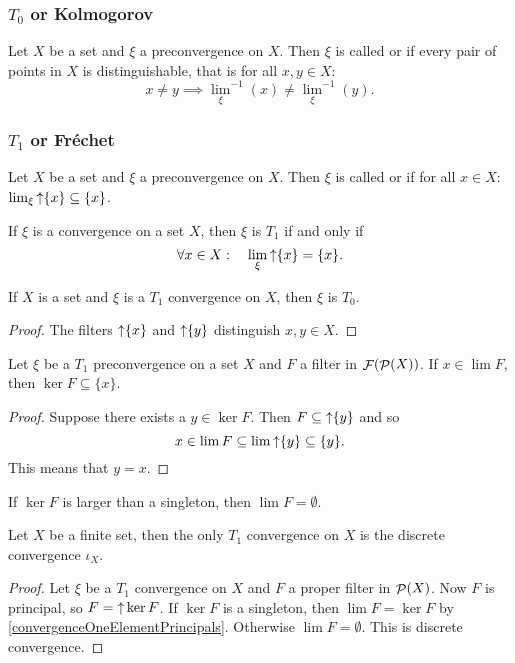 \subsubsection{$T_0$ or Kolmogorov}
\begin{definition}
Let $X$ be a set and $\xi$ a preconvergence on $X$. Then $\xi$ is called  or  if every pair of points in $X$ is distinguishable, that is for all $x,y\in X$:
\[ x\neq y \implies {\lim_\xi}^{-1}(x) \neq {\lim_\xi}^{-1}(y). \]
\end{definition}

\subsubsection{$T_1$ or Fréchet}
\begin{definition}
Let $X$ be a set and $\xi$ a preconvergence on $X$. Then $\xi$ is called  or  if for all $x\in X$: $\lim_\xi \mathop{\uparrow}\{x\} \subseteq \{x\}$.
\end{definition}

\begin{lemma} \label{convergenceOneElementPrincipals}
If $\xi$ is a convergence on a set $X$, then $\xi$ is $T_1$ \textup{if and only if}
\[ \forall x\in X: \quad \lim_\xi\mathop{\uparrow}\{x\} = \{x\}. \]
\end{lemma}

\begin{lemma}
If $X$ is a set and $\xi$ is a $T_1$ convergence on $X$, then $\xi$ is $T_0$.
\end{lemma}
\begin{proof}
The filters $\mathop{\uparrow}\{x\}$ and $\mathop{\uparrow}\{y\}$ distinguish $x,y\in X$.
\end{proof}

\begin{proposition}
Let $\xi$ be a $T_1$ preconvergence on a set $X$ and $F$ a filter in $\mathop{\mathcal{F}}(\mathop{\mathcal{P}}(X))$. If $x\in \lim F$, then $\ker F \subseteq \{x\}$.
\end{proposition}
\begin{proof}
Suppose there exists a $y \in \ker F$. Then $F \subseteq \mathop{\uparrow} \{y\}$ and so
\[ x \in \lim F \subseteq \lim \mathop{\uparrow}\{y\} \subseteq \{y\}. \]
This means that $y = x$.
\end{proof}
\begin{corollary}
If $\ker F$ is larger than a singleton, then $\lim F = \emptyset$.
\end{corollary}
\begin{corollary} \label{finiteConfvergenceDiscrete}
Let $X$ be a finite set, then the only $T_1$ convergence on $X$ is the discrete convergence $\iota_X$.
\end{corollary}
\begin{proof}
Let $\xi$ be a $T_1$ convergence on $X$ and $F$ a proper filter in $\mathop{\mathcal{P}}(X)$. Now $F$ is principal, so $F = \mathop{\uparrow} \ker F$. If $\ker F$ is a singleton, then $\lim F = \ker F$ by \ref{convergenceOneElementPrincipals}. Otherwise $\lim F = \emptyset$. This is discrete convergence.
\end{proof}

